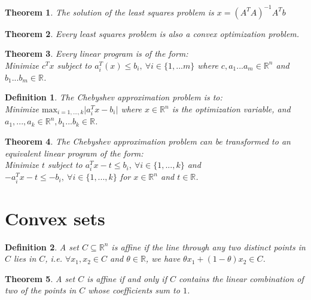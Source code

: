 \documentclass[a4paper]{article}
\newtheorem{mytheorem}{Theorem}
\newtheorem{mydef}{Definition}
\numberwithin{mytheorem}{section}
\numberwithin{mydef}{section}
\numberwithin{example}{section}
\begin{document}
\begin{mytheorem} The solution of the least squares problem is $x = (A^{T}A)^{-1}A^{T}b$ \end{mytheorem}

\begin{mytheorem} Every least squares problem is also a convex optimization problem. \end{mytheorem}

\begin{mytheorem} Every linear program is of the form: \\
Minimize $c^{T}x$ subject to $a^{T}_{i}(x) \leq b_{i}, \ \forall i \in \{1,...m\}$ where $c,a_{1}...a_{m} \in \mathbb{R}^{n}$ and $b_{1}...b_{m} \in \mathbb{R}$. 
\end{mytheorem}

\begin{mydef} The Chebyshev approximation problem is to: \\
Minimize $\text{max}_{i=1,...,k} \lvert a^{T}_{i}x-b_{i}\rvert$ where $x \in \mathbb{R}^{n}$ is the optimization variable, and $a_{1},...,a_{k} \in \mathbb{R}^{n},b_{1}...b_{k} \in \mathbb{R}$.
\end{mydef}

\begin{mytheorem} The Chebyshev approximation problem can be transformed to an equivalent linear program of the form: \\
Minimize $t$ subject to $a^{T}_{i}x - t \leq b_{i}, \ \forall i \in \{ 1,...,k\}$ and $-a^{T}_{i}x - t \leq -b_{i}, \ \forall i \in \{ 1,...,k\}$ for $x \in \mathbb{R}^{n}$ and $t \in \mathbb{R}$.
\end{mytheorem}

\section{Convex sets}

\begin{mydef} A set $C \subseteq \mathbb{R}^{n}$ is affine if the line through any two distinct points in $C$ lies in $C$, i.e. $\forall x_{1},x_{2} \in C$ and $\theta \in \mathbb{R}$, we have $\theta x_{1} + (1-\theta)x_{2} \in C$.
\end{mydef}

\begin{mytheorem} A set $C$ is affine if and only if $C$ contains the linear combination of two of the points in $C$ whose coefficients sum to $1$. \end{mytheorem}
\end{document}
